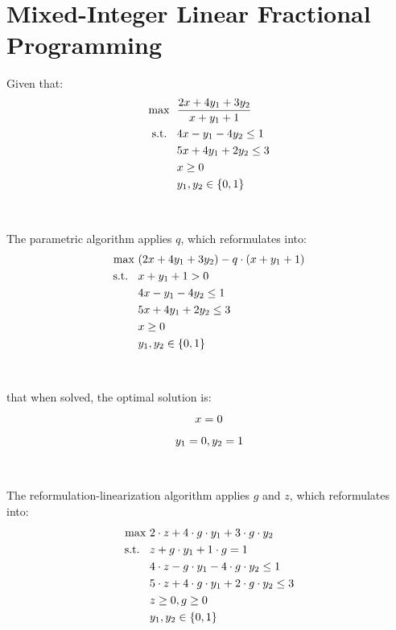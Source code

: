 \documentclass{article}
\begin{document}
\section*{Mixed-Integer Linear Fractional Programming}
Given that:
    \begin{equation}
    \begin{split}
        \text{max \space} & \frac{2x + 4y_1 + 3y_2}{x + y_1 + 1}\\
        \text{s.t. \space} & \space 4x - y_1 - 4y_2 \leq 1\\
        & 5x + 4y_1 + 2y_2 \leq 3\\
        & x \geq 0\\
        & y_1, y_2 \in \{0, 1\}
    \end{split}
    \end{equation}
\\~\\
The parametric algorithm applies $q$, which reformulates into:
    \begin{equation}
    \begin{split}
        \text{max\space} & (2x + 4y_1 + 3y_2) - q \cdot (x + y_1 + 1)\\
        \text{s.t. \space} & x + y_1 + 1 > 0\\
        & \space 4x - y_1 - 4y_2 \leq 1\\
        & 5x + 4y_1 + 2y_2 \leq 3\\
        & x \geq 0\\
        & y_1, y_2 \in \{0, 1\}
    \end{split}
    \end{equation}
\\~\\
that when solved, the optimal solution is:
    \begin{equation}\nonumber
        x = 0\\
    \end{equation}
    \begin{equation}
        y_1 = 0, y_2 = 1\\
    \end{equation}
\\~\\
The reformulation-linearization algorithm applies $g$ and $z$, which reformulates into:
    \begin{equation}
    \begin{split}
        \text{max\space} & 2 \cdot z + 4\cdot g \cdot y_1 + 3 \cdot g \cdot y_2 \\
        \text{s.t. \space} & z + g \cdot y_1 + 1 \cdot g = 1\\
        & \space 4 \cdot z - g \cdot y_1 - 4 \cdot g \cdot y_2 \leq 1\\
        & 5 \cdot z + 4 \cdot g \cdot y_1 + 2 \cdot g \cdot y_2 \leq 3\\
        & z \geq 0, g \geq 0\\
        & y_1, y_2 \in \{0, 1\}
    \end{split}
    \end{equation}
\end{document}
